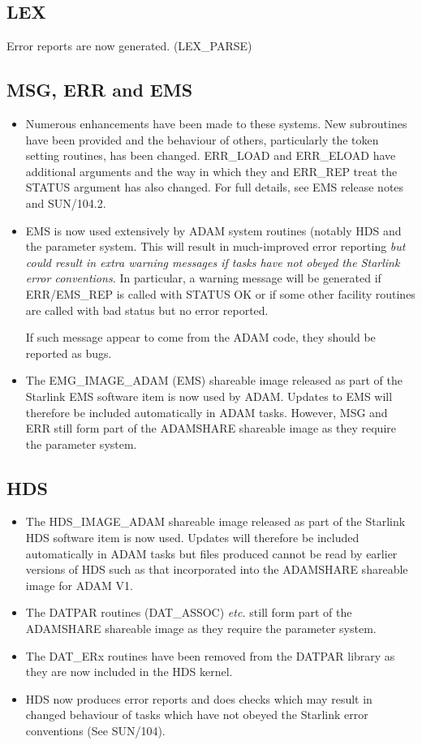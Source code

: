\subsection{LEX}
Error reports are now generated. (LEX\_PARSE)

\subsection{MSG, ERR and EMS}
\label{ems}
\begin{itemize}
\item Numerous enhancements have been made to these systems.
New subroutines have been provided and the behaviour of others, particularly
the token setting routines, has been changed.
ERR\_LOAD and ERR\_ELOAD have additional arguments and
the way in which they and ERR\_REP treat the STATUS argument has also changed.
For full details, see EMS release notes and SUN/104.2.
\item EMS is now used extensively by ADAM system routines (notably HDS and
the parameter system.
This will result in much-improved error reporting {\em but could result in
extra warning messages if tasks have not obeyed the Starlink error 
conventions.}
In particular, a warning  message will be generated if ERR/EMS\_REP is 
called with STATUS OK or if some other facility routines are called with
bad status but no error reported.

If such message appear to come from the ADAM code, they should be reported
as bugs.
\item The EMG\_IMAGE\_ADAM (EMS) shareable image released as part of the 
Starlink EMS software item is now used by ADAM. 
Updates to EMS will therefore be included automatically in ADAM tasks. 
However, MSG and ERR still form part of the ADAMSHARE shareable image as they 
require the parameter system.
\end{itemize}

\subsection{HDS}
\begin{itemize}
\item The HDS\_IMAGE\_ADAM shareable image released as part of the Starlink HDS
software item is now used. Updates will therefore be included automatically
in ADAM tasks but files produced cannot be read by earlier versions of HDS
such as that incorporated into the ADAMSHARE shareable image for ADAM V1.
\item The DATPAR routines (DAT\_ASSOC) {\em etc.} still form part of the
ADAMSHARE shareable image as they require the parameter system.
\item The DAT\_ERx routines have been removed from the DATPAR library as they
are now included in the HDS kernel.
\item HDS now produces error reports and does checks which may result in 
changed behaviour of tasks which have not obeyed the Starlink error conventions
(See SUN/104).
\end{itemize}

